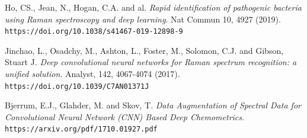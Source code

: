 \begin{thebibliography}{9}
Ho, CS., Jean, N., Hogan, C.A. and al.
\textit{Rapid identification of pathogenic bacteria using Raman spectroscopy and deep learning}. 
Nat Commun 10, 4927 (2019).
\\\texttt{https://doi.org/10.1038/s41467-019-12898-9}

Jinchao, L., Osadchy, M., Ashton, L., Foster, M., Solomon, C.J. and Gibson, Stuart J.
\textit{Deep convolutional neural networks for Raman spectrum recognition: a unified solution}.
Analyst, 142, 4067-4074 (2017).
\\\texttt{https://doi.org/10.1039/C7AN01371J}

Bjerrum, E.J., Glahder, M. and Skov, T.
\textit{Data Augmentation of Spectral Data for Convolutional Neural Network (CNN) Based Deep Chemometrics}.
\\\texttt{https://arxiv.org/pdf/1710.01927.pdf}
\end{thebibliography}

